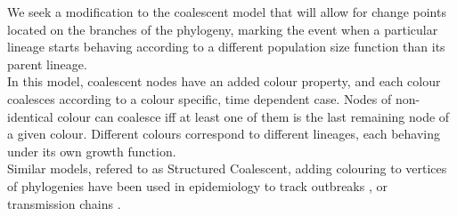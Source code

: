 \documentclass{report}
\theoremstyle{definition}
\begin{document}
We seek a modification to the coalescent model that will allow for change points located on the branches of the phylogeny, marking the event when a particular lineage starts behaving according to a different population size function than its parent lineage.\\

In this model, coalescent nodes have an added colour property, and each colour coalesces according to a colour specific, time dependent case. Nodes of non-identical colour can coalesce iff at least one of them is the last remaining node of a given colour.
Different colours correspond to different lineages, each behaving under its own growth function.\\

Similar models, refered to as Structured Coalescent, adding colouring to vertices of phylogenies have been used in epidemiology to track outbreaks \cite{maio_scotti_2016}, or transmission chains \cite{didelot_genomic_2017}.
\end{document}
